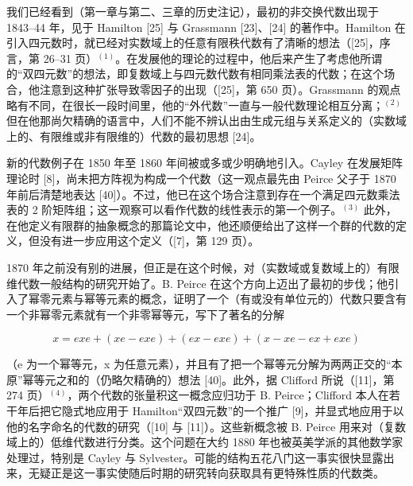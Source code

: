 
我们已经看到（第一章与第二、三章的历史注记），最初的非交换代数出现于 1843--44 年，见于 Hamilton {[}25{]} 与 Grassmann {[}23{]}、{[}24{]} 的著作中。Hamilton 在引入四元数时，就已经对实数域上的任意有限秩代数有了清晰的想法（{[}25{]}，序言，第 26--31 页）\(^{(1)}\)。在发展他的理论的过程中，他后来产生了考虑他所谓的“双四元数”的想法，即复数域上与四元数代数有相同乘法表的代数；在这个场合，他注意到这种扩张导致零因子的出现（{[}25{]}，第 650 页）。Grassmann 的观点略有不同，在很长一段时间里，他的“外代数”一直与一般代数理论相互分离；\(^{(2)}\) 但在他那尚欠精确的语言中，人们不能不辨认出由生成元组与关系定义的（实数域上的、有限维或非有限维的）代数的最初思想 {[}24{]}。

新的代数例子在 1850 年至 1860 年间被或多或少明确地引入。Cayley 在发展矩阵理论时 {[}8{]}，尚未把方阵视为构成一个代数（这一观点最先由 Peirce 父子于 1870 年前后清楚地表达 {[}40{]}）。不过，他已在这个场合注意到存在一个满足四元数乘法表的 2 阶矩阵组；这一观察可以看作代数的线性表示的第一个例子。\(^{(3)}\) 此外，在他定义有限群的抽象概念的那篇论文中，他还顺便给出了这样一个群的代数的定义，但没有进一步应用这个定义（{[}7{]}，第 129 页）。

1870 年之前没有别的进展，但正是在这个时候，对（实数域或复数域上的）有限维代数一般结构的研究开始了。B. Peirce 在这个方向上迈出了最初的步伐；他引入了幂零元素与幂等元素的概念，证明了一个（有或没有单位元的）代数只要含有一个非幂零元素就有一个非零幂等元，写下了著名的分解

\[
x = e x e + (x e - e x e) + (e x - e x e) + (x - x e - e x + e x e)
\]

（e 为一个幂等元，x 为任意元素），并且有了把一个幂等元分解为两两正交的“本原”幂等元之和的（仍略欠精确的）想法 {[}40{]}。此外，据 Clifford 所说（{[}11{]}，第 274 页）\(^{(4)}\)，两个代数的张量积这一概念应归功于 B. Peirce；Clifford 本人在若干年后把它隐式地应用于 Hamilton“双四元数”的一个推广 {[}9{]}，并显式地应用于以他的名字命名的代数的研究（{[}10{]} 与 {[}11{]}）。这些新概念被 B. Peirce 用来对（复数域上的）低维代数进行分类。这个问题在大约 1880 年也被英美学派的其他数学家处理过，特别是 Cayley 与 Sylvester。可能的结构五花八门这一事实很快显露出来，无疑正是这一事实使随后时期的研究转向获取具有更特殊性质的代数类。

